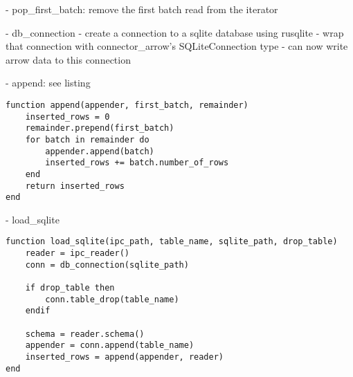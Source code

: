 - pop_first_batch: remove the first batch read from the iterator

- db_connection
- create a connection to a sqlite database using rusqlite
- wrap that connection with connector\_arrow's SQLiteConnection type
- can now write arrow data to this connection

- append: see listing
\begin{listing}
	\begin{verbatim}
function append(appender, first_batch, remainder)
	inserted_rows = 0
	remainder.prepend(first_batch)
	for batch in remainder do
		appender.append(batch)
		inserted_rows += batch.number_of_rows
	end
	return inserted_rows
end
	\end{verbatim}
\end{listing}

- load\_sqlite
\begin{listing}
	\begin{verbatim}
function load_sqlite(ipc_path, table_name, sqlite_path, drop_table)
	reader = ipc_reader()
	conn = db_connection(sqlite_path)

	if drop_table then
		conn.table_drop(table_name)
	endif

	schema = reader.schema()
	appender = conn.append(table_name)
	inserted_rows = append(appender, reader)
end
	\end{verbatim}
\end{listing}

